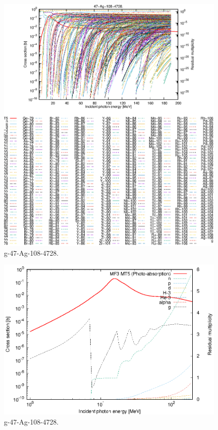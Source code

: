 \begin{figure}
 \includegraphics[width=\linewidth]{eps/g_47-Ag-108_4728.eps}
  \caption{g-47-Ag-108-4728.}
\end{figure}
\newpage \clearpage

\begin{figure}
 \includegraphics[width=\linewidth]{eps-log/g_47-Ag-108_4728.eps}
 \caption{g-47-Ag-108-4728.}
\end{figure}
\newpage \clearpage

